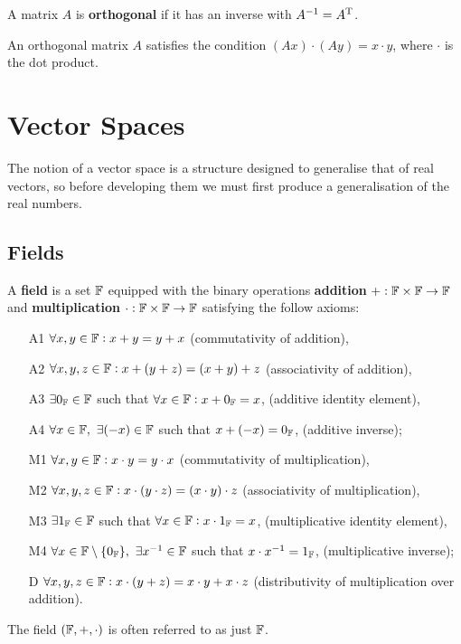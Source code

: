 \documentclass[../Year1.tex]{subfiles}
\begin{document}
\begin{definition}
    A matrix $A$ is \textbf{orthogonal} if it has an inverse with $A^{-1}=A^{\mathrm{T}}$.
\end{definition}

\begin{theorem}
    An orthogonal matrix $A$ satisfies the condition $(Ax) \cdot (Ay) = x \cdot y$, where $\cdot$ is the dot product.
\end{theorem}

\section{Vector Spaces}
The notion of a vector space is a structure designed to generalise that of real vectors, so before developing them we must first produce a generalisation of the real numbers.
\subsection{Fields}
\begin{definition}[Field]
    A \textbf{field} is a set $\mathbb{F}$ equipped with the binary operations \textbf{addition} $+:\mathbb{F}\times\mathbb{F}\rightarrow\mathbb{F}$ and \textbf{multiplication} $\cdot:\mathbb{F}\times\mathbb{F}\rightarrow\mathbb{F}$ satisfying the follow axioms:
    \begin{enumerate}
        \item[A1] $\forall x,y \in \mathbb{F}: x+y=y+x$ (commutativity of addition),
        \item[A2] $\forall x,y,z \in \mathbb{F}: x+(y+z)=(x+y)+z$ (associativity of addition),
        \item[A3] $\exists 0_{\mathbb{F}} \in \mathbb{F}$ such that $\forall x\in\mathbb{F}: x + 0_{\mathbb{F}} = x$, (additive identity element),
        \item[A4] $\forall x\in\mathbb{F}, \ \exists (-x)\in\mathbb{F}$ such that $x+(-x)=0_{\mathbb{F}}$, (additive inverse);
        
        \item[M1] $\forall x,y \in \mathbb{F}: x\cdot y=y\cdot x$ (commutativity of multiplication),
        \item[M2] $\forall x,y,z \in \mathbb{F}: x\cdot (y\cdot z)=(x\cdot y)\cdot z$ (associativity of multiplication),
        \item[M3] $\exists 1_{\mathbb{F}} \in \mathbb{F}$ such that $\forall x\in\mathbb{F}: x \cdot  1_{\mathbb{F}} = x$, (multiplicative identity element),
        \item[M4] $\forall x\in\mathbb{F}\setminus\{0_{\mathbb{F}}\}, \ \exists x^{-1}\in\mathbb{F}$ such that $x\cdot x^{-1}=1_{\mathbb{F}}$, (multiplicative inverse);

        \item[D] $\forall x,y,z \in \mathbb{F}: x\cdot(y+z)=x\cdot y+x\cdot z$ (distributivity of multiplication over addition).
    \end{enumerate}
    The field $(\mathbb{F},+,\cdot)$ is often referred to as just $\mathbb{F}$.
\end{definition}
\end{document}
